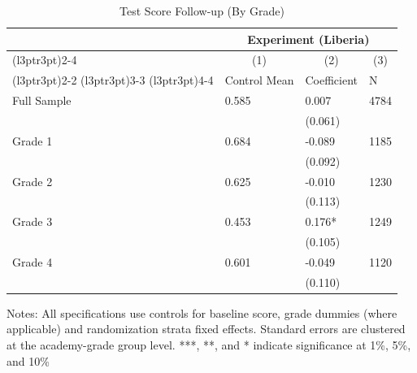 \begin{table}[!h]
\centering
\caption{Test Score Follow-up (By Grade)}
\centering
\begin{threeparttable}
\begin{tabular}[t]{llll}
\toprule
\multicolumn{1}{c}{ } & \multicolumn{3}{c}{Experiment (Liberia)} \\
\cmidrule(l{3pt}r{3pt}){2-4}
\multicolumn{1}{c}{ } & \multicolumn{1}{c}{(1)} & \multicolumn{1}{c}{(2)} & \multicolumn{1}{c}{(3)} \\
\cmidrule(l{3pt}r{3pt}){2-2} \cmidrule(l{3pt}r{3pt}){3-3} \cmidrule(l{3pt}r{3pt}){4-4}
 & Control Mean & Coefficient & N\\
\midrule
Full Sample & 0.585 & 0.007 & 4784\\
 &  & (0.061) & \\
Grade 1 & 0.684 & -0.089 & 1185\\
 &  & (0.092) & \\
Grade 2 & 0.625 & -0.010 & 1230\\
 &  & (0.113) & \\
Grade 3 & 0.453 & 0.176* & 1249\\
 &  & (0.105) & \\
Grade 4 & 0.601 & -0.049 & 1120\\
 &  & (0.110) & \\
\bottomrule
\end{tabular}
\begin{tablenotes}[para]
\item Notes: All specifications use controls for baseline score, grade dummies (where applicable) and randomization strata fixed effects. Standard errors are clustered at the academy-grade group level. ***, **, and * indicate significance at 1\%, 5\%, and 10\%
\end{tablenotes}
\end{threeparttable}
\end{table}
